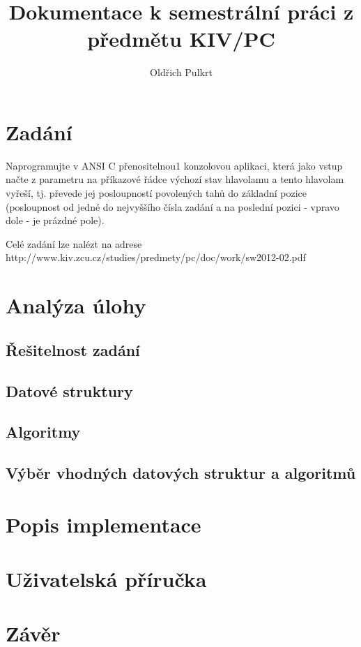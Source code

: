 \documentclass[12pt]{report}
\author{Oldřich Pulkrt}
\title{Dokumentace k semestrální práci z předmětu KIV/PC}
\begin{document}
\maketitle
\tableofcontents

\chapter{Zadání}
Naprogramujte v ANSI C přenositelnou1 konzolovou aplikaci, která jako vstup načte z parametru na příkazové řádce výchozí stav hlavolamu  a tento hlavolam vyřeší, tj. převede jej posloupností povolených tahů do základní pozice (posloupnost od jedné do nejvyššího čísla zadání a na poslední pozici - vpravo dole - je prázdné pole).
\par
Celé zadání lze nalézt na adrese http://www.kiv.zcu.cz/studies/predmety/pc/doc/work/sw2012-02.pdf

\chapter{Analýza úlohy}

\section{Řešitelnost zadání}

\section{Datové struktury}

\section{Algoritmy}

\section{Výběr vhodných datových struktur a algoritmů}

\chapter{Popis implementace}

\chapter{Uživatelská příručka}

\chapter{Závěr}
\end{document}

